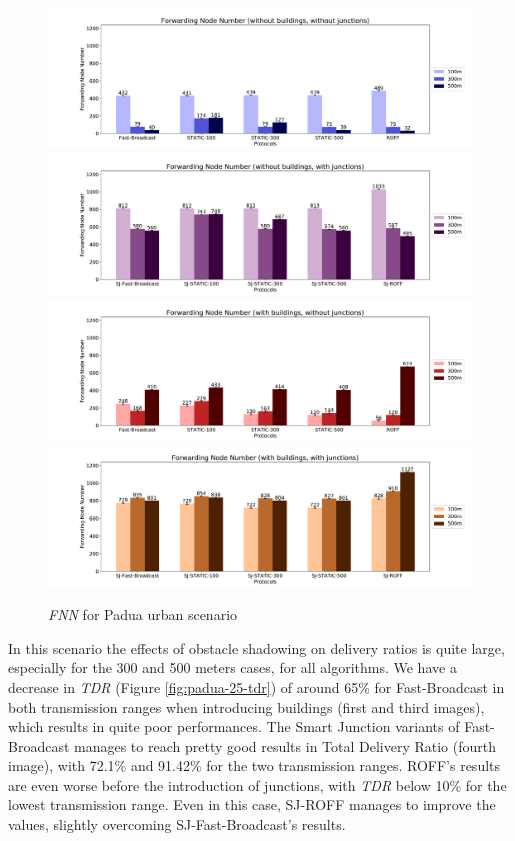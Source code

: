 		\begin{figure}[H]
			\centering
			\includegraphics[width=1.0\textwidth]{immagini/padua-25/b0/j0/fnn}
			\includegraphics[width=1.0\textwidth]{immagini/padua-25/b0/j1/fnn}
			\includegraphics[width=1.0\textwidth]{immagini/padua-25/b1/j0/fnn}
			\includegraphics[width=1.0\textwidth]{immagini/padua-25/b1/j1/fnn}
			\caption{\textit{FNN} for Padua urban scenario}
			\label{fig:padua-25-fnn}
		\end{figure}
	
		In this scenario the effects of obstacle shadowing on delivery ratios is quite large, especially for the 300 and 500 meters cases, for all algorithms. We have a decrease in \textit{TDR} (Figure \ref{fig:padua-25-tdr}) of around 65\% for Fast-Broadcast in both transmission ranges when introducing buildings (first and third images), which results in quite poor performances. The Smart Junction variants of Fast-Broadcast manages to reach pretty good results in Total Delivery Ratio (fourth image), with 72.1\% and 91.42\% for the two transmission ranges. ROFF's results are even worse before the introduction of junctions, with \textit{TDR} below 10\% for the lowest transmission range. Even in this case, SJ-ROFF manages to improve the values, slightly overcoming SJ-Fast-Broadcast's results.
		
